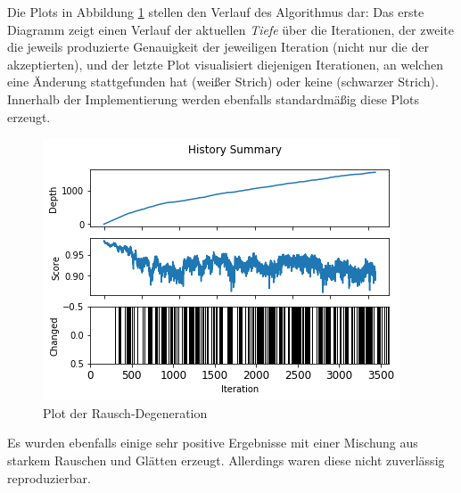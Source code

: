 Die Plots in Abbildung \ref{fig:plotTiefe4000} stellen den Verlauf des Algorithmus dar: Das erste Diagramm zeigt einen Verlauf der aktuellen \textit{Tiefe} über die Iterationen, der zweite die jeweils produzierte Genauigkeit der jeweiligen Iteration (nicht nur die der akzeptierten), und der letzte Plot visualisiert diejenigen Iterationen, an welchen eine Änderung stattgefunden hat (weißer Strich) oder keine (schwarzer Strich). Innerhalb der Implementierung werden ebenfalls standardmäßig diese Plots erzeugt.

\begin{figure}[h]
	\centering
	\includegraphics[width=0.6\linewidth]{Images/DegenSamples/StopTiefe4000Plot}
	\caption[Plot Degeneration]{Plot der Rausch-Degeneration}
	\label{fig:plotTiefe4000}
\end{figure}
Es wurden ebenfalls einige sehr positive Ergebnisse mit einer Mischung aus starkem Rauschen und Glätten erzeugt. Allerdings waren diese nicht zuverlässig reproduzierbar. 


